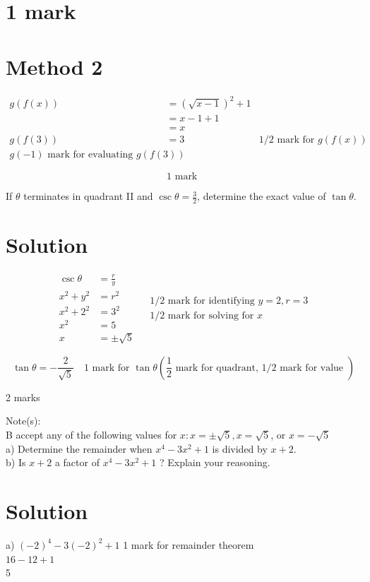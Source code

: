 \documentclass[10pt]{article}
\begin{document}
\section*{1 mark}
\section*{Method 2}
$$
\begin{array}{rlr}
g(f(x)) & =(\sqrt{x-1})^{2}+1 & \\
& =x-1+1 & \\
& =x & \\
g(f(3)) & =3 & 1 / 2 \text { mark for } g(f(x)) \\
g(-1) \text { mark for evaluating } g(f(3))
\end{array}
$$

$$
1 \text { mark }
$$

If $\theta$ terminates in quadrant II and $\csc \theta=\frac{3}{2}$, determine the exact value of $\tan \theta$.

\section*{Solution}
$$
\begin{array}{rlr}
\csc \theta & =\frac{r}{y} \\
x^{2}+y^{2} & =r^{2} \\
x^{2}+2^{2} & =3^{2} \\
x^{2} & =5 \\
x & = \pm \sqrt{5}
\end{array} \begin{aligned}
& 1 / 2 \text { mark for identifying } y=2, r=3 \\
& 1 / 2 \text { mark for solving for } x
\end{aligned}
$$

$$
\tan \theta=-\frac{2}{\sqrt{5}} \quad 1 \text { mark for } \tan \theta\left(\frac{1}{2} \text { mark for quadrant, } 1 / 2 \text { mark for value }\right)
$$

2 marks

Note(s):\\
B accept any of the following values for $x: x= \pm \sqrt{5}, x=\sqrt{5}$, or $x=-\sqrt{5}$\\
a) Determine the remainder when $x^{4}-3 x^{2}+1$ is divided by $x+2$.\\
b) Is $x+2$ a factor of $x^{4}-3 x^{2}+1$ ? Explain your reasoning.

\section*{Solution}
a) $(-2)^{4}-3(-2)^{2}+1$ 1 mark for remainder theorem\\
$16-12+1$\\
5
\end{document}
